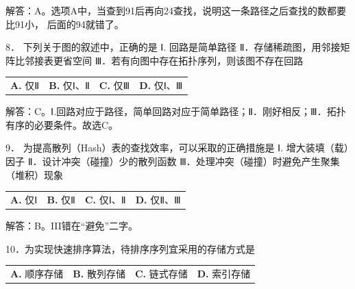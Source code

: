 \documentclass[UTF8,11pt]{ctexart}
\begin{document}
解答：A。选项A中，当查到91后再向24查找，说明这一条路径之后查找的数都要比91小， 后面的94就错了。


8． 下列关于图的叙述中，正确的是 Ⅰ. 回路是简单路径 Ⅱ．存储稀疏图，用邻接矩阵比邻接表更省空间 Ⅲ．若有向图中存在拓扑序列，则该图不存在回路


\begin{center}\begin{tabular}{>{\raggedright\arraybackslash}p{\dimexpr(\linewidth-8\tabcolsep)/4\relax}>{\raggedright\arraybackslash}p{\dimexpr(\linewidth-8\tabcolsep)/4\relax}>{\raggedright\arraybackslash}p{\dimexpr(\linewidth-8\tabcolsep)/4\relax}>{\raggedright\arraybackslash}p{\dimexpr(\linewidth-8\tabcolsep)/4\relax}}
\textbf{A.} 仅Ⅱ & \textbf{B.} 仅Ⅰ、Ⅱ & \textbf{C.} 仅Ⅲ & \textbf{D.} 仅Ⅰ、Ⅲ\\[.35em]\end{tabular}\end{center}

解答：C。Ⅰ.回路对应于路径，简单回路对应于简单路径；Ⅱ．刚好相反；Ⅲ．拓扑有序的必要条件。故选C。


9． 为提高散列（Hash）表的查找效率，可以采取的正确措施是 Ⅰ. 增大装填（载）因子 Ⅱ．设计冲突（碰撞）少的散列函数 Ⅲ．处理冲突（碰撞）时避免产生聚集（堆积）现象


\begin{center}\begin{tabular}{>{\raggedright\arraybackslash}p{\dimexpr(\linewidth-8\tabcolsep)/4\relax}>{\raggedright\arraybackslash}p{\dimexpr(\linewidth-8\tabcolsep)/4\relax}>{\raggedright\arraybackslash}p{\dimexpr(\linewidth-8\tabcolsep)/4\relax}>{\raggedright\arraybackslash}p{\dimexpr(\linewidth-8\tabcolsep)/4\relax}}
\textbf{A.} 仅Ⅰ & \textbf{B.} 仅Ⅱ & \textbf{C.} 仅Ⅰ、Ⅱ & \textbf{D.} 仅Ⅱ、Ⅲ\\[.35em]\end{tabular}\end{center}

解答：B。III错在“避免”二字。


10．为实现快速排序算法，待排序序列宜采用的存储方式是


\begin{center}\begin{tabular}{>{\raggedright\arraybackslash}p{\dimexpr(\linewidth-8\tabcolsep)/4\relax}>{\raggedright\arraybackslash}p{\dimexpr(\linewidth-8\tabcolsep)/4\relax}>{\raggedright\arraybackslash}p{\dimexpr(\linewidth-8\tabcolsep)/4\relax}>{\raggedright\arraybackslash}p{\dimexpr(\linewidth-8\tabcolsep)/4\relax}}
\textbf{A.} 顺序存储 & \textbf{B.} 散列存储 & \textbf{C.} 链式存储 & \textbf{D.} 索引存储\\[.35em]\end{tabular}\end{center}
\end{document}
